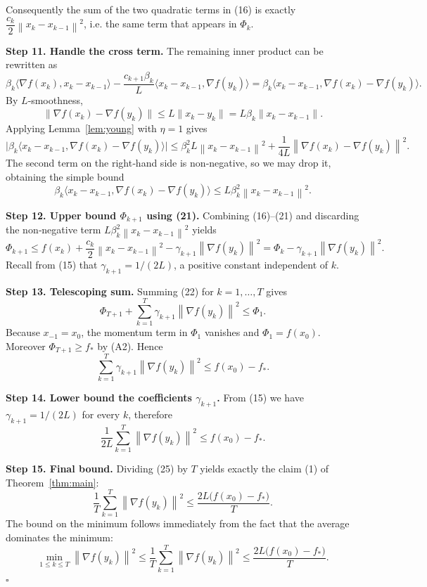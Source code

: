 \documentclass{article}
\newcommand{\norm}[1]{\left\lVert#1\right\rVert}
\newcommand{\grad}{\nabla}
\begin{document}
Consequently the sum of the two quadratic terms in (16) is exactly
$\dfrac{c_k}{2}\norm{x_k-x_{k-1}}^{2}$, i.e. the same term that appears in
$\Phi_k$.

\noindent\textbf{Step 11.  Handle the cross term.}  
The remaining inner product can be rewritten as
\[
\beta_k\langle\grad f(x_k),x_k-x_{k-1}\rangle
   -\frac{c_{k+1}\beta_k}{L}\langle x_k-x_{k-1},\grad f(y_k)\rangle
 =\beta_k\langle x_k-x_{k-1},\grad f(x_k)-\grad f(y_k)\rangle .
\tag{19}
\]
By $L$‑smoothness,
\[
\|\grad f(x_k)-\grad f(y_k)\|\le L\|x_k-y_k\|
   =L\beta_k\|x_k-x_{k-1}\|.
\]
Applying Lemma~\ref{lem:young} with $\eta=1$ gives
\[
\bigl|\beta_k\langle x_k-x_{k-1},\grad f(x_k)-\grad f(y_k)\rangle\bigr|
   \le \beta_k^{2}L\norm{x_k-x_{k-1}}^{2}
   +\frac{1}{4L}\norm{\grad f(x_k)-\grad f(y_k)}^{2}.
\tag{20}
\]
The second term on the right‑hand side is non‑negative, so we may drop it,
obtaining the simple bound
\[
\beta_k\langle x_k-x_{k-1},\grad f(x_k)-\grad f(y_k)\rangle
   \le L\beta_k^{2}\norm{x_k-x_{k-1}}^{2}.
\tag{21}
\]

\noindent\textbf{Step 12.  Upper bound $\Phi_{k+1}$ using (21).}  
Combining (16)–(21) and discarding the non‑negative term
$L\beta_k^{2}\norm{x_k-x_{k-1}}^{2}$ yields
\[
\Phi_{k+1}
\le f(x_k)+\frac{c_k}{2}\norm{x_k-x_{k-1}}^{2}
      -\gamma_{k+1}\norm{\grad f(y_k)}^{2}
= \Phi_k -\gamma_{k+1}\norm{\grad f(y_k)}^{2}.
\tag{22}
\]
Recall from (15) that $\gamma_{k+1}=1/(2L)$, a positive constant independent
of $k$.

\noindent\textbf{Step 13.  Telescoping sum.}  
Summing (22) for $k=1,\dots,T$ gives
\[
\Phi_{T+1} + \sum_{k=1}^{T}\gamma_{k+1}\norm{\grad f(y_k)}^{2}
   \le \Phi_{1}.
\tag{23}
\]
Because $x_{-1}=x_{0}$, the momentum term in $\Phi_{1}$ vanishes and
$\Phi_{1}=f(x_{0})$.  Moreover $\Phi_{T+1}\ge f_*$ by (A2).  Hence
\[
\sum_{k=1}^{T}\gamma_{k+1}\norm{\grad f(y_k)}^{2}
   \le f(x_{0})-f_* .
\tag{24}
\]

\noindent\textbf{Step 14.  Lower bound the coefficients $\gamma_{k+1}$.}  
From (15) we have $\gamma_{k+1}=1/(2L)$ for every $k$, therefore
\[
\frac{1}{2L}\sum_{k=1}^{T}\norm{\grad f(y_k)}^{2}
   \le f(x_{0})-f_* .
\tag{25}
\]

\noindent\textbf{Step 15.  Final bound.}  
Dividing (25) by $T$ yields exactly the claim (1) of Theorem~\ref{thm:main}:
\[
\frac{1}{T}\sum_{k=1}^{T}\norm{\grad f(y_k)}^{2}
   \le \frac{2L\bigl(f(x_{0})-f_*\bigr)}{T}.
\tag{26}
\]
The bound on the minimum follows immediately from the fact that the
average dominates the minimum:
\[
\min_{1\le k\le T}\norm{\grad f(y_k)}^{2}
\le \frac{1}{T}\sum_{k=1}^{T}\norm{\grad f(y_k)}^{2}
\le \frac{2L\bigl(f(x_{0})-f_*\bigr)}{T}.
\tag{27}
\]
\hfill $\square$
\end{document}
